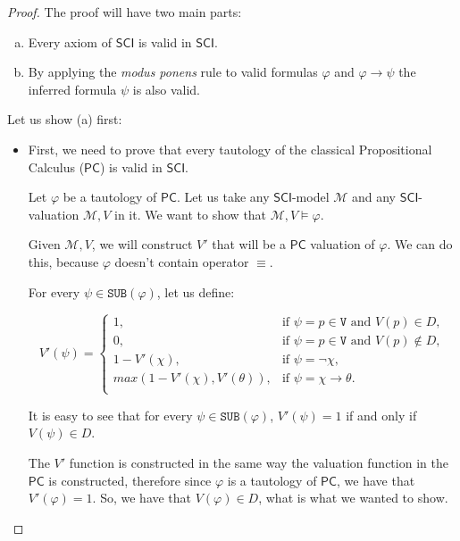\documentclass{article}
\theoremstyle{definition}
\theoremstyle{definition}
\theoremstyle{definition}
\newcommand*{\id}{\equiv}
\newcommand*{\ra}{\rightarrow}
\newcommand*{\V}{\texttt{V}}
\newcommand*{\SUB}{\texttt{SUB}}
\newcommand{\SCI}{$\mathsf{SCI}$\xspace}
\newcommand{\PC}{$\mathsf{PC}$\xspace}
\begin{document}
\begin{proof}
    The proof will have two main parts:
    \begin{enumerate}[(a)]
        \item Every axiom of \SCI is valid in \SCI.
        \item By applying the \emph{modus ponens} rule to valid formulas $\varphi$ and
              $\varphi \ra \psi$ the inferred formula $\psi$ is also valid.
    \end{enumerate}

    Let us show (a) first:
    \begin{itemize}
        \item First, we need to prove that every tautology of the classical Propositional
              Calculus (\PC) is valid in \SCI.

              Let $\varphi$ be a tautology of \PC. Let us take any \SCI-model $\mathcal{M}$
              and any \SCI-valuation $\mathcal{M}, V$ in it. We want to show that
              $\mathcal{M}, V \models \varphi$.

              Given $\mathcal{M}, V$, we will construct $V'$ that will be a \PC valuation of
              $\varphi$. We can do this, because $\varphi$ doesn't contain operator $\id$.

              For every $\psi \in \SUB(\varphi)$, let us define:

              $$
                  V'(\psi) = \begin{cases}
                      1,                           & \text{if } \psi = p \in \V \text{ and } V(p) \in D,      \\
                      0,                           & \text{if } \psi = p \in \V \text{ and } V(p) \not \in D, \\
                      1-V'(\chi),                  & \text{if } \psi = \lnot \chi,                            \\
                      max(1-V'(\chi), V'(\theta)), & \text{if } \psi = \chi \ra \theta.                       \\
                  \end{cases}
              $$

              It is easy to see that for every $\psi \in \SUB(\varphi)$, $V'(\psi) = 1$ if
              and only if $V(\psi) \in D$.

              The $V'$ function is constructed in the same way the valuation function in the
              \PC is constructed, therefore since $\varphi$ is a tautology of \PC, we have
              that $V'(\varphi) = 1$. So, we have that $V(\varphi) \in D$, what is what we
              wanted to show.


\end{itemize}
\end{proof}
\end{document}
